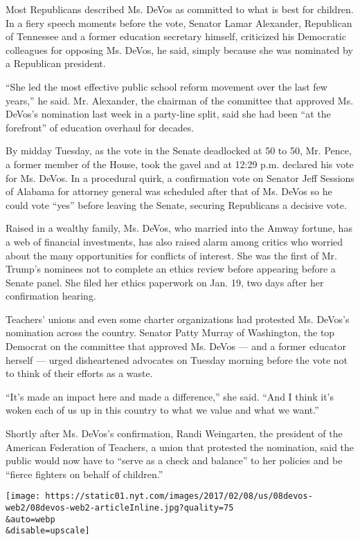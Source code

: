 Most Republicans described Ms. DeVos as committed to what is best for
children. In a fiery speech moments before the vote, Senator Lamar
Alexander, Republican of Tennessee and a former education secretary
himself, criticized his Democratic colleagues for opposing Ms. DeVos, he
said, simply because she was nominated by a Republican president.

``She led the most effective public school reform movement over the last
few years,'' he said. Mr. Alexander, the chairman of the committee that
approved Ms. DeVos's nomination last week in a party-line split, said
she had been ``at the forefront'' of education overhaul for decades.

By midday Tuesday, as the vote in the Senate deadlocked at 50 to 50, Mr.
Pence, a former member of the House, took the gavel and at 12:29 p.m.
declared his vote for Ms. DeVos. In a procedural quirk, a confirmation
vote on Senator Jeff Sessions of Alabama for attorney general was
scheduled after that of Ms. DeVos so he could vote ``yes'' before
leaving the Senate, securing Republicans a decisive vote.

Raised in a wealthy family, Ms. DeVos, who married into the Amway
fortune, has a web of financial investments, has also raised alarm among
critics who worried about the many opportunities for conflicts of
interest. She was the first of Mr. Trump's nominees not to complete an
ethics review before appearing before a Senate panel. She filed her
ethics paperwork on Jan. 19, two days after her confirmation hearing.

Teachers' unions and even some charter organizations had protested Ms.
DeVos's nomination across the country. Senator Patty Murray of
Washington, the top Democrat on the committee that approved Ms. DeVos
--- and a former educator herself --- urged disheartened advocates on
Tuesday morning before the vote not to think of their efforts as a
waste.

``It's made an impact here and made a difference,'' she said. ``And I
think it's woken each of us up in this country to what we value and what
we want.''

Shortly after Ms. DeVos's confirmation, Randi Weingarten, the president
of the American Federation of Teachers, a union that protested the
nomination, said the public would now have to ``serve as a check and
balance'' to her policies and be ``fierce fighters on behalf of
children.''

\texttt{[image: https://static01.nyt.com/images/2017/02/08/us/08devos-web2/08devos-web2-articleInline.jpg?quality=75\\\&auto=webp\\\&disable=upscale]}

